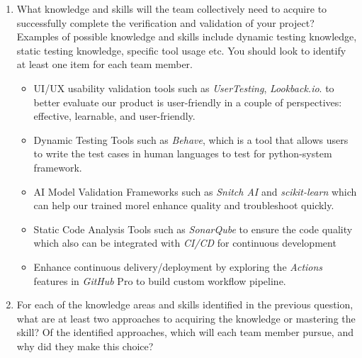 \documentclass[12pt, titlepage]{article}
\begin{document}
\begin{enumerate}
  \item What knowledge and skills will the team collectively need to acquire to
  successfully complete the verification and validation of your project?
  Examples of possible knowledge and skills include dynamic testing knowledge,
  static testing knowledge, specific tool usage etc.  You should look to
  identify at least one item for each team member.


  \begin{itemize}
    \item UI/UX usability validation tools such  as \textit{UserTesting}, \textit{Lookback.io}. to better evaluate our product is user-friendly in a couple of perspectives: effective, learnable, and user-friendly.
    \item Dynamic Testing Tools such as \textit{Behave}, which is a tool that allows users to write the test cases in human languages to test for python-system framework. 
    \item AI Model Validation Frameworks such as \textit{Snitch AI} and \textit{scikit-learn} which can help our trained morel enhance quality and troubleshoot quickly.
    \item Static Code Analysis Tools such as \textit{SonarQube} to ensure the code quality which also can be integrated with \textit{CI/CD} for continuous development
    \item Enhance continuous delivery/deployment by exploring the \textit{Actions} features in \textit{GitHub} Pro to build custom workflow pipeline.
   \end{itemize} 


  \item For each of the knowledge areas and skills identified in the previous
  question, what are at least two approaches to acquiring the knowledge or
  mastering the skill?  Of the identified approaches, which will each team
  member pursue, and why did they make this choice?



\end{enumerate}
\end{document}

